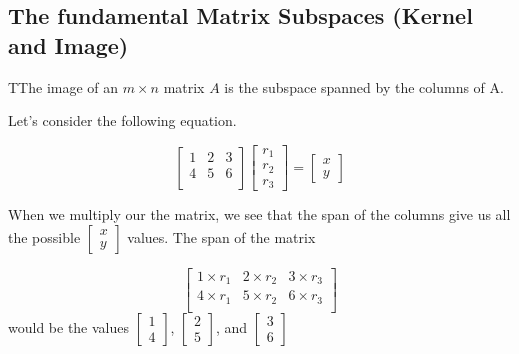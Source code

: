 \subsection{The fundamental Matrix Subspaces (Kernel and Image)}

  \begin{definition}
    TThe image of an $m\times n$ matrix $A$ is the subspace spanned by the columns of A.
  \end{definition}

  \begin{problem}

    Let's consider the following equation. 

    \begin{equation}
      \begin{bmatrix}
        1&2&3\\4&5&6\\
      \end{bmatrix}
      \begin{bmatrix}
        r_1\\r_2\\r_3
      \end{bmatrix}
      =
      \begin{bmatrix}
        x\\y
      \end{bmatrix}
    \end{equation}

    When we multiply our the matrix, we see that the span of the columns give us all the possible $\left[\begin{smallmatrix}x\\y\end{smallmatrix}\right]$ values. The span of the matrix 

    \begin{equation}
      \begin{bmatrix}
        1\times r_1&2\times r_2&3\times r_3\\
        4\times r_1&5\times r_2&6\times r_3\\
      \end{bmatrix}
    \end{equation}
    would be the values $\left[\begin{smallmatrix}1\\4\end{smallmatrix}\right]$, $\left[\begin{smallmatrix}2\\5\end{smallmatrix}\right]$, and $\left[\begin{smallmatrix}3\\6\end{smallmatrix}\right]$
  \end{problem}

